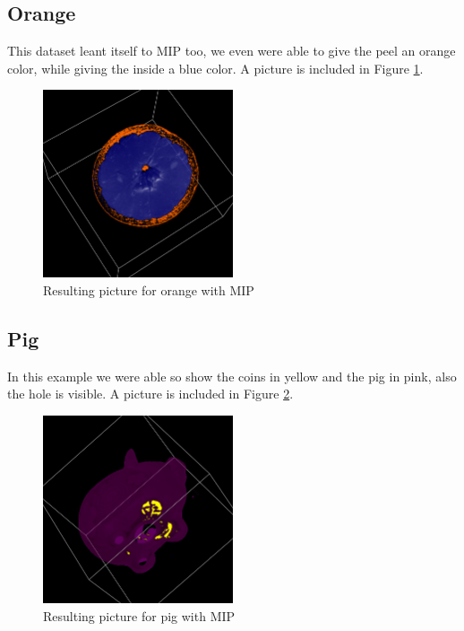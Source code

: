 \documentclass[a4paper,twoside,11pt]{article}
\begin{document}
\subsection{Orange}
This dataset leant itself to MIP too, we even were able to give the peel an orange color, while giving the inside a blue color. A picture is included in Figure \ref{MO}.
\begin{figure}[!h]
  \centering
  \includegraphics[width=0.5\textwidth]{MO.png}
  \caption{Resulting picture for orange with MIP}
  \label{MO}
\end{figure}

\subsection{Pig}
In this example we were able so show the coins in yellow and the pig in pink, also the hole is visible. A picture is included in Figure \ref{MP}.
\begin{figure}[!h]
  \centering
  \includegraphics[width=0.5\textwidth]{MP.png}
  \caption{Resulting picture for pig with MIP}
  \label{MP}
\end{figure}
\end{document}
